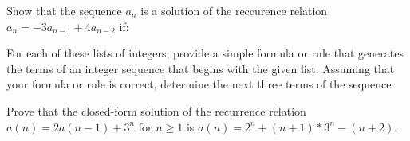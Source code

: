\documentclass{exam}
\begin{document}
\begin{questions}

\question Show that the sequence $a_{n}$ is a solution of the reccurence relation $a_{n}=-3a_{n-1}+4a_{n-2}$ if:


\question For each of these lists of integers, provide a simple formula or rule that generates the terms of an integer sequence that begins with the given list. Assuming that your
formula or rule is correct, determine the next three terms
of the sequence
\question Prove that the closed-form solution of the recurrence relation $a(n) = 2a(n-1) + 3^n$ for $n \geq 1$ is $a(n) = 2^n + (n+1) * 3^n - (n+2)$.
\vspace{9in}
\end{questions}
\end{document}
